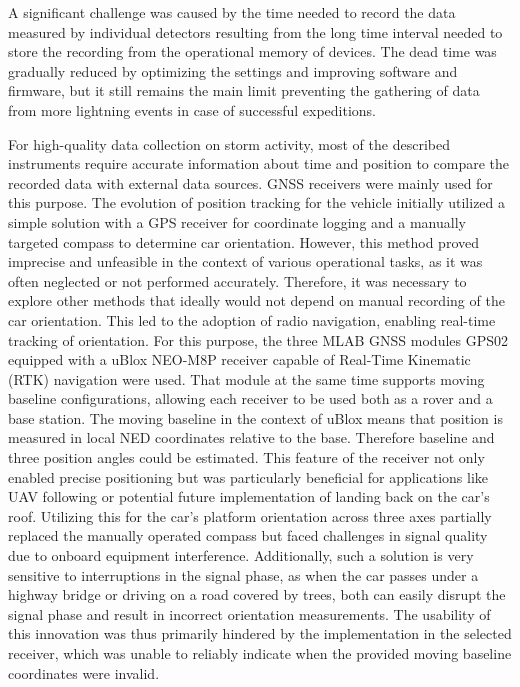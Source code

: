 A significant challenge was caused by the time needed to record the data measured by individual detectors resulting from the long time interval needed to store the recording from the operational memory of devices. The dead time was gradually reduced by optimizing the settings and improving software and firmware, but it still remains the main limit preventing the gathering of data from more lightning events in case of successful expeditions.  

For high-quality data collection on storm activity, most of the described instruments require accurate information about time and position to compare the recorded data with external data sources.
GNSS receivers were mainly used for this purpose. The evolution of position tracking for the vehicle initially utilized a simple solution with a GPS receiver for coordinate logging and a manually targeted compass to determine car orientation. However, this method proved imprecise and unfeasible in the context of various operational tasks, as it was often neglected or not performed accurately.
Therefore, it was necessary to explore other methods that ideally would not depend on manual recording of the car orientation. This led to the adoption of radio navigation, enabling real-time tracking of orientation. For this purpose, the three MLAB GNSS modules GPS02 equipped with a uBlox NEO-M8P receiver capable of Real-Time Kinematic (RTK) navigation were used. That module at the same time supports moving baseline configurations, allowing each receiver to be used both as a rover and a base station. The moving baseline in the context of uBlox means that position is measured in local NED coordinates relative to the base. Therefore baseline and three position angles could be estimated. 
This feature of the receiver not only enabled precise positioning but was particularly beneficial for applications like UAV following or potential future implementation of landing back on the car's roof. Utilizing this for the car's platform orientation across three axes partially replaced the manually operated compass but faced challenges in signal quality due to onboard equipment interference. Additionally, such a solution is very sensitive to interruptions in the signal phase, as when the car passes under a highway bridge or driving on a road covered by trees, both can easily disrupt the signal phase and result in incorrect orientation measurements. The usability of this innovation was thus primarily hindered by the implementation in the selected receiver, which was unable to reliably indicate when the provided moving baseline coordinates were invalid.

